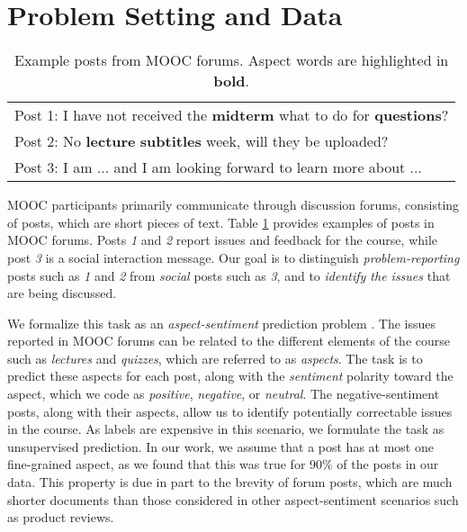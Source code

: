 \section{Problem Setting and Data}

\begin{table} [t] %
\scriptsize{
\begin{tabular}{|p{7.5cm}|}
\hline
    \scriptsize{Post 1: I have not received the \textbf{midterm} what to do for \textbf{questions}?}  \\
    \scriptsize{Post 2: No \textbf{lecture} \textbf{subtitles} week, will they be uploaded?}  \\ 
    \scriptsize{Post 3: I am ... and I am looking forward to learn more about ...}  \\   
\hline
    \end{tabular}
    }
    \vspace{-0.35cm}
    \caption{Example posts from MOOC forums. Aspect words are highlighted in \textbf{bold}.}
  \label{table:moocposts}
\vspace{-0.4cm}
\end{table}

MOOC participants primarily communicate through discussion forums, consisting of posts, which are short pieces of text.  Table \ref{table:moocposts} provides examples of posts in MOOC forums. Posts \textit{1} and \textit{2} report issues and feedback for the course, while post \textit{3} is a social interaction message. Our goal is to distinguish \textit{problem-reporting} posts such as \textit{1} and \textit{2} from \textit{social} posts such as \textit{3}, and to \textit{identify the issues} that are being discussed.  

We formalize this task as an \emph{aspect-sentiment} prediction problem \cite{booksliu}.  The issues reported in MOOC forums can be related to the different elements of the course such as \textit{lectures} and \textit{quizzes}, which are referred to as \textit{aspects}.  The task is to predict these aspects for each post, along with the \textit{sentiment} polarity toward the aspect, which we code as \textit{positive}, \textit{negative}, or \textit{neutral}.  The negative-sentiment posts, along with their aspects, allow us to identify potentially correctable issues in the course. As labels are expensive in this scenario, we formulate the task as unsupervised prediction.
In our work, we assume that a post has at most one fine-grained aspect, as we found that this was true for 90\% of the posts in our data. %
This property is due in part to the brevity of forum posts, which are much shorter documents than those considered in other aspect-sentiment scenarios such as product reviews.


